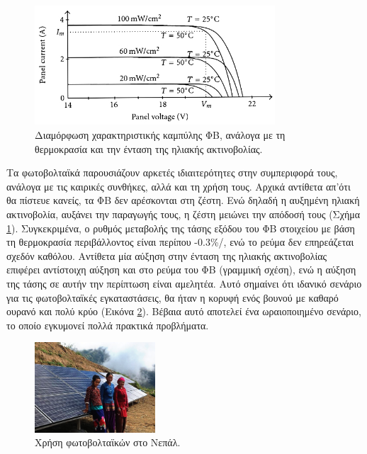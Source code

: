 \documentclass[12pt]{report}
\begin{document}
\begin{figure}[h]
				\center
				\includegraphics[width=0.8\textwidth]{ivcurve}
				\captionsetup{width=0.9\textwidth}
				\caption{Διαμόρφωση χαρακτηριστικής καμπύλης {} ΦΒ, ανάλογα με τη θερμοκρασία και την ένταση της ηλιακής ακτινοβολίας.}
				\label{fig:ivcurve}
\end{figure}

Τα φωτοβολταϊκά παρουσιάζουν αρκετές ιδιαιτερότητες στην συμπεριφορά τους, ανάλογα με τις καιρικές συνθήκες, αλλά και τη χρήση τους. Αρχικά αντίθετα απ'ότι θα πίστευε κανείς, τα ΦΒ δεν αρέσκονται στη ζέστη. Ενώ δηλαδή η αυξημένη 
ηλιακή ακτινοβολία, αυξάνει την παραγωγής τους, η ζέστη μειώνει την απόδοσή τους (Σχήμα \ref{fig:ivcurve}). Συγκεκριμένα, ο ρυθμός μεταβολής της τάσης εξόδου του ΦΒ στοιχείου με βάση τη θερμοκρασία περιβάλλοντος είναι περίπου 
-0.3\%/{}, ενώ το ρεύμα δεν επηρεάζεται σχεδόν καθόλου. Αντίθετα μία αύξηση στην ένταση της ηλιακής ακτινοβολίας επιφέρει αντίστοιχη αύξηση και στο ρεύμα του ΦΒ (γραμμική σχέση), ενώ η αύξηση της τάσης σε αυτήν την 
περίπτωση είναι αμελητέα. Αυτό σημαίνει ότι ιδανικό σενάριο για τις φωτοβολταϊκές εγκαταστάσεις, θα ήταν η κορυφή ενός βουνού με καθαρό ουρανό και πολύ κρύο (Εικόνα \ref{fig:nepal}). Βέβαια αυτό αποτελεί ένα ωραιοποιημένο σενάριο, 
το οποίο εγκυμονεί πολλά πρακτικά προβλήματα. 

\begin{figure}
				\includegraphics[width=0.4\textwidth]{nepal}
				\captionsetup{name=Εικόνα}
				\caption{Χρήση φωτοβολταϊκών στο Νεπάλ.}
				\label{fig:nepal}
\end{figure}
\end{document}
